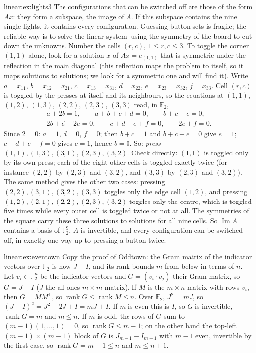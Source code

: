 \begin{solution}{linear:ex:lights3}
\idea The configurations that can be switched off are those of the form $Ax$: they form a subspace, the image of $A$. If
this subspace contains the nine single lights, it contains every configuration. Guessing button sets is fragile; the
reliable way is to solve the linear system, using the symmetry of the board to cut down the unknowns.
\writeup Number the cells $(r,c)$, $1\le r,c\le3$. To toggle the corner $(1,1)$ alone, look for a solution $x$ of
$Ax=e_{(1,1)}$ that is symmetric under the reflection in the main diagonal (this reflection maps the problem to itself, so
it maps solutions to solutions; we look for a symmetric one and will find it). Write $a=x_{11}$, $b=x_{12}=x_{21}$,
$c=x_{13}=x_{31}$, $d=x_{22}$, $e=x_{23}=x_{32}$, $f=x_{33}$. Cell $(r,c)$ is toggled by the presses at itself and its
neighbours, so the equations at $(1,1)$, $(1,2)$, $(1,3)$, $(2,2)$, $(2,3)$, $(3,3)$ read, in $\mathbb F_2$,
\[
\begin{gathered}a+2b=1,\qquad a+b+c+d=0,\qquad b+c+e=0,\\ 2b+d+2e=0,\qquad c+d+e+f=0,\qquad 2e+f=0.\end{gathered}
\]
Since $2=0$: $a=1$, $d=0$, $f=0$; then $b+c=1$ and $b+c+e=0$ give $e=1$; $c+d+e+f=0$ gives $c=1$, hence $b=0$. So:
\emph{press $(1,1),(1,3),(3,1),(2,3),(3,2)$}. Check directly: $(1,1)$ is toggled only by its own press; each of the eight
other cells is toggled exactly twice (for instance $(2,2)$ by $(2,3)$ and $(3,2)$, and $(3,3)$ by $(2,3)$ and $(3,2)$).
The same method gives the other two cases: pressing $(2,2),(3,1),(3,2),(3,3)$ toggles only the edge cell $(1,2)$, and
pressing $(1,2),(2,1),(2,2),(2,3),(3,2)$ toggles only the centre, which is toggled five times while every outer cell is
toggled twice or not at all. The symmetries of the square carry these three solutions to solutions for all nine cells.
So $\operatorname{Im}A$ contains a basis of $\mathbb F_2^9$, $A$ is invertible, and every configuration can be switched
off, in exactly one way up to pressing a button twice.
\end{solution}

\begin{solution}{linear:ex:eventown}
\idea Copy the proof of Oddtown: the Gram matrix of the indicator vectors over $\mathbb F_2$ is now $J-I$, and its rank
bounds $m$ from below in terms of $n$.
\writeup Let $v_i\in\mathbb F_2^n$ be the indicator vectors and $G=(v_i\cdot v_j)$ their Gram matrix, so $G=J-I$ ($J$ the
all-ones $m\times m$ matrix). If $M$ is the $m\times n$ matrix with rows $v_i$, then $G=MM^{\mathsf T}$, so
$\operatorname{rank}G\le\operatorname{rank}M\le n$. Over $\mathbb F_2$, $J^2=mJ$, so $(J-I)^2=J^2-2J+I=mJ+I$. If $m$ is
even this is $I$, so $G$ is invertible, $\operatorname{rank}G=m$ and $m\le n$. If $m$ is odd, the rows of $G$ sum to
$(m-1)(1,\dots,1)=0$, so $\operatorname{rank}G\le m-1$; on the other hand the top-left $(m-1)\times(m-1)$ block of $G$ is
$J_{m-1}-I_{m-1}$ with $m-1$ even, invertible by the first case, so $\operatorname{rank}G=m-1\le n$ and $m\le n+1$.
\end{solution}

